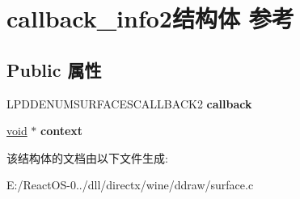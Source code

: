 \hypertarget{structcallback__info2}{}\section{callback\+\_\+info2结构体 参考}
\label{structcallback__info2}
\subsection*{Public 属性}
\begin{DoxyCompactItemize}
\item 
\mbox{\label{structcallback__info2_a924757bde899fa1f1730bde8c52a394d}} 
L\+P\+D\+D\+E\+N\+U\+M\+S\+U\+R\+F\+A\+C\+E\+S\+C\+A\+L\+L\+B\+A\+C\+K2 {\bfseries callback}
\item 
\mbox{\label{structcallback__info2_a8d2e56f764a0f44a3a64150a2b60065f}} 
\hyperlink{interfacevoid}{void} $\ast$ {\bfseries context}
\end{DoxyCompactItemize}


该结构体的文档由以下文件生成\+:\begin{DoxyCompactItemize}
\item 
E\+:/\+React\+O\+S-\/0../dll/directx/wine/ddraw/surface.\+c\end{DoxyCompactItemize}
